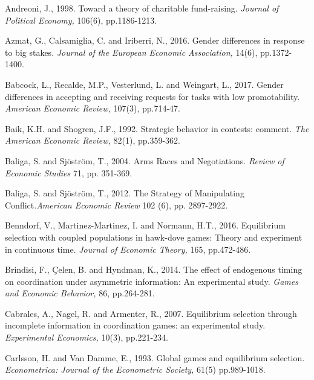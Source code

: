 \documentclass[11pt,english]{article}
\begin{document}
\newpage
\begin{thebibliography}{10}

\bibitem{} Andreoni, J., 1998. Toward a theory of charitable fund-raising. \textit{Journal of Political Economy,} 106(6), pp.1186-1213.

\bibitem{} Azmat, G., Calsamiglia, C. and Iriberri, N., 2016. Gender differences in response to big stakes. \textit{Journal of the European Economic Association,} 14(6), pp.1372-1400.

\bibitem{} Babcock, L., Recalde, M.P., Vesterlund, L. and Weingart, L., 2017. Gender differences in accepting and receiving requests for tasks with low promotability. \textit{American Economic Review,} 107(3), pp.714-47.

\bibitem{} Baik, K.H. and Shogren, J.F., 1992. Strategic behavior in contests: comment. \textit{The American Economic Review,} 82(1), pp.359-362.

  Baliga, S. and Sj\"ostr\"om, T., 2004. Arms Races and Negotiations. \textit{Review of Economic Studies} 71, pp. 351-369.





  Baliga, S. and Sj\"ostr\"om, T., 2012. The Strategy of Manipulating Conflict.\textit{American Economic Review} 102 (6), pp. 2897-2922.

 Benndorf, V., Martinez-Martinez, I. and Normann, H.T., 2016. Equilibrium selection with coupled populations in hawk-dove games: Theory and experiment in continuous time. \textit{Journal of Economic Theory,} 165, pp.472-486.

 Brindisi, F., \c{C}elen, B. and Hyndman, K., 2014. The effect of endogenous timing on coordination under asymmetric information: An experimental study. \textit{Games and Economic Behavior,} 86, pp.264-281.

\bibitem{} Cabrales, A., Nagel, R. and Armenter, R., 2007. Equilibrium selection through incomplete information in coordination games: an experimental study. \textit{Experimental Economics,} 10(3), pp.221-234.

\bibitem{} Carlsson, H. and Van Damme, E., 1993. Global games and equilibrium selection. \textit{Econometrica: Journal of the Econometric Society,} 61(5) pp.989-1018.


\end{thebibliography}
\end{document}

